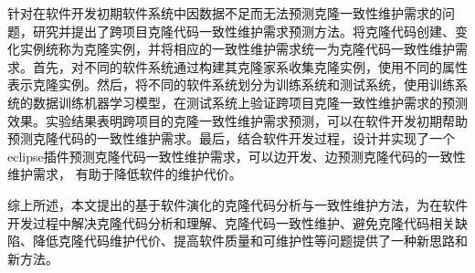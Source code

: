 {针对在软件开发初期软件系统中因数据不足而无法预测克隆一致性维护需求的问题，研究并提出了跨项目克隆代码一致性维护需求预测方法。将克隆代码创建、变化实例统称为克隆实例，并将相应的一致性维护需求统一为克隆代码一致性维护需求。首先，对不同的软件系统通过构建其克隆家系收集克隆实例，使用不同的属性表示克隆实例。然后，将不同的软件系统划分为训练系统和测试系统，使用训练系统的数据训练机器学习模型，在测试系统上验证跨项目克隆一致性维护需求的预测效果。实验结果表明跨项目的克隆一致性维护需求预测，可以在软件开发初期帮助预测克隆代码的一致性维护需求。最后，结合软件开发过程，设计并实现了一个eclipse插件预测克隆代码一致性维护需求，可以边开发、边预测克隆代码的一致性维护需求， 有助于降低软件的维护代价。

综上所述，本文提出的基于软件演化的克隆代码分析与一致性维护方法，为在软件开发过程中解决克隆代码分析和理解、克隆代码一致性维护、避免克隆代码相关缺陷、降低克隆代码维护代价、提高软件质量和可维护性等问题提供了一种新思路和新方法。
}


